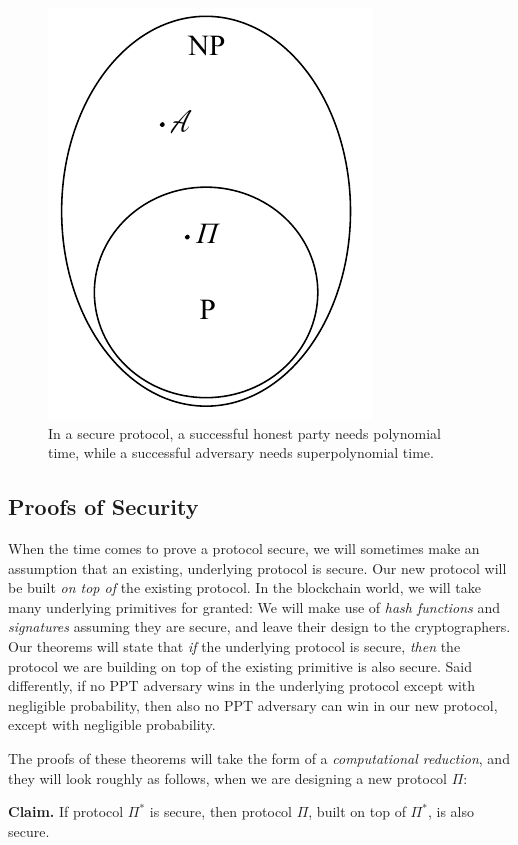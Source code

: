 \begin{figure}[h]
    \centering
    \includegraphics[width=0.3 \columnwidth,keepaspectratio]{figures/p-vs-np.pdf}
    \caption{In a secure protocol, a successful honest party needs polynomial time,
    while a successful adversary needs superpolynomial time.}
    \label{fig.p-vs-np}
\end{figure}

\subsection*{Proofs of Security}

When the time comes to prove a protocol secure, we will sometimes make an assumption
that an existing, underlying protocol is secure. Our new protocol will be built
\emph{on top of} the existing protocol. In the blockchain world, we will take many
underlying primitives for granted: We will make use of \emph{hash functions}
and \emph{signatures} assuming they are secure, and leave their design to the
cryptographers. Our theorems will state that \emph{if} the underlying protocol is
secure, \emph{then} the protocol we are building on top of the existing primitive
is also secure. Said differently, if no PPT adversary wins in the underlying protocol
except with negligible probability, then also no PPT adversary can win in our new
protocol, except with negligible probability.

The proofs of these theorems will take the form of a \emph{computational reduction},
and they will look roughly as follows, when we are designing a new protocol $\Pi$:

\noindent
\textbf{Claim. } If protocol $\Pi^*$ is secure, then protocol $\Pi$, built on top of $\Pi^*$,
is also secure.

